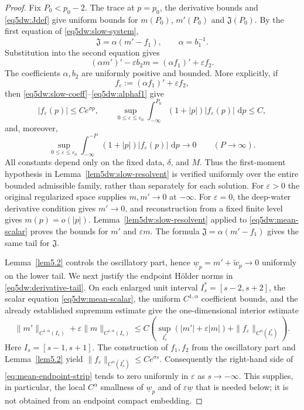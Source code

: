 \documentclass[11pt,reqno]{amsart}
\numberwithin{equation}{section}
\newcommand{\dd}{\,\mathrm{d}}
\theoremstyle{definition}
\theoremstyle{remark}
\begin{document}
\begin{proof}
Fix $P_0<p_0-2$.  The trace at $p=p_0$, the derivative bounds and
\eqref{eq5dw:Jdef} give uniform bounds for $m(P_0)$,
$m'(P_0)$ and $\mathfrak J(P_0)$.  By the first equation of
\eqref{eq5dw:slow-system},
\[
 \mathfrak J=\alpha(m'-f_1),\qquad \alpha=b_1^{-1}.
\]
Substitution into the second equation gives
\begin{equation}\label{eq5dw:mean-scalar}
 (\alpha m')'-\varepsilon b_2m
 =(\alpha f_1)'+\varepsilon f_2.
\end{equation}
The coefficients $\alpha,b_2$ are uniformly positive and bounded.
More explicitly, if
\[
 f_\varepsilon:=(\alpha f_1)'+\varepsilon f_2,
\]
then \eqref{eq5dw:slow-coeff}--\eqref{eq5dw:alphaf1} give
\begin{equation}\label{eq:mean-forcing-first-moment}
 |f_\varepsilon(p)|\le Ce^{\sigma p},\qquad
 \sup_{0\le\varepsilon\le\varepsilon_0}
 \int_{-\infty}^{P_0}(1+|p|)|f_\varepsilon(p)|\,\dd p\le C,
\end{equation}
and, moreover,
\[
 \sup_{0\le\varepsilon\le\varepsilon_0}
 \int_{-\infty}^{-P}(1+|p|)|f_\varepsilon(p)|\,\dd p
 \longrightarrow0\qquad(P\to\infty).
\]
All constants depend only on the fixed data, $\delta$, and $M$.
Thus the first-moment hypothesis in
Lemma~\ref{lem5dw:slow-resolvent} is verified uniformly over the
entire bounded admissible family, rather than separately for each
solution.  For $\varepsilon>0$ the original
regularized space supplies $m,m'\to0$ at $-\infty$.  For
$\varepsilon=0$, the deep-water derivative condition gives
$m'\to0$, and reconstruction from a fixed finite level gives
$m(p)=o(|p|)$.  Lemma~\ref{lem5dw:slow-resolvent} applied to
\eqref{eq5dw:mean-scalar} proves the bounds for $m'$ and
$\varepsilon m$.  The formula
$\mathfrak J=\alpha(m'-f_1)$ gives the same tail for $\mathfrak J$.

Lemma~\ref{lem5.2} controls the oscillatory part, hence
$\underline w_p=m'+\widetilde w_p\to0$ uniformly on the lower tail.
We next justify the endpoint H\"older norms in
\eqref{eq5dw:derivative-tail}.  On each enlarged unit interval
$I_s^*=[s-2,s+2]$, the scalar equation
\eqref{eq5dw:mean-scalar}, the uniform $C^{1,\alpha}$ coefficient
bounds, and the already established supremum estimate give the
one-dimensional interior estimate
\begin{equation}\label{eq:mean-endpoint-strip}
 \|m'\|_{C^{1,\alpha}(I_s)}
 +\varepsilon\|m\|_{C^{1,\alpha}(I_s)}
 \le C\left(
  \sup_{I_s^*}(|m'|+\varepsilon|m|)
  +\|f_\varepsilon\|_{C^\alpha(I_s^*)}
 \right).
\end{equation}
Here $I_s=[s-1,s+1]$.  The construction of $f_1,f_2$ from the
oscillatory part and Lemma~\ref{lem5.2} yield
$\|f_\varepsilon\|_{C^\alpha(I_s^*)}\le Ce^{\sigma s}$.
Consequently the right-hand side of
\eqref{eq:mean-endpoint-strip} tends to zero uniformly in
$\varepsilon$ as $s\to-\infty$.  This supplies, in particular, the
local $C^\alpha$ smallness of $\underline w_p$ and of
$\varepsilon\underline w$ that is needed below; it is not obtained
from an endpoint compact embedding.


\end{proof}
\end{document}
